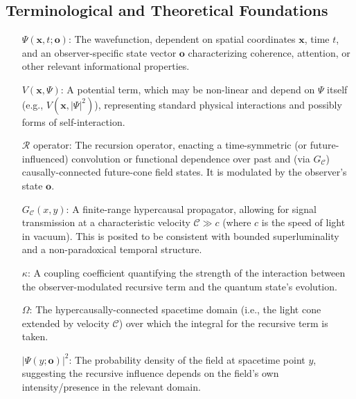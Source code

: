 \documentclass{report}
\begin{document}
\subsection{Terminological and Theoretical Foundations} %
\label{subsec:rho_terminology}
\begin{itemize}
    \itemsep0em
    \item[\(\Psi(\mathbf{x},t;\mathbf{o})\):] The wavefunction, dependent on spatial coordinates \(\mathbf{x}\), time \(t\), and an observer-specific state vector \(\mathbf{o}\) characterizing coherence, attention, or other relevant informational properties.
    \item[\(V(\mathbf{x},\Psi)\):] A potential term, which may be non-linear and depend on \(\Psi\) itself (e.g., $V(\mathbf{x}, |\Psi|^2)$), representing standard physical interactions and possibly forms of self-interaction.
    \item[\(\mathcal{R}\) operator:] The recursion operator, enacting a time-symmetric (or future-influenced) convolution or functional dependence over past and (via \(G_\mathcal{C}\)) causally-connected future-cone field states. It is modulated by the observer's state \(\mathbf{o}\).
    \item[\(G_\mathcal{C}(x,y)\):] A finite-range hypercausal propagator, allowing for signal transmission at a characteristic velocity \(\mathcal{C} \gg c\) (where $c$ is the speed of light in vacuum). This is posited to be consistent with bounded superluminality and a non-paradoxical temporal structure.
    \item[\(\kappa\):] A coupling coefficient quantifying the strength of the interaction between the observer-modulated recursive term and the quantum state’s evolution.
    \item[\(\Omega\):] The hypercausally-connected spacetime domain (i.e., the light cone extended by velocity \(\mathcal{C}\)) over which the integral for the recursive term is taken.
    \item[\(|\Psi(y;\mathbf{o})|^2\):] The probability density of the field at spacetime point $y$, suggesting the recursive influence depends on the field's own intensity/presence in the relevant domain.
\end{itemize}
\end{document}
